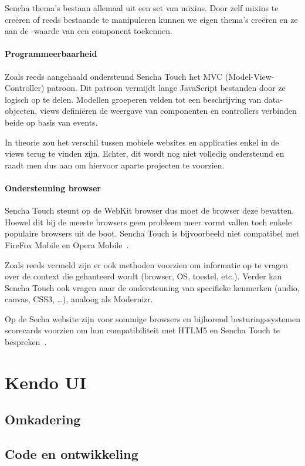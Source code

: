 Sencha thema's bestaan allemaal uit een set van mixins.  Door zelf mixins te creëren of reeds bestaande te manipuleren kunnen we eigen thema's creëren en ze aan de -waarde van een component toekennen.

\paragraph{Programmeerbaarheid}
\label{sec:sencha-programeerbaarheid}
Zoals reeds aangehaald ondersteund Sencha Touch het MVC (Model-View-Controller) patroon.  Dit patroon vermijdt lange JavaScript bestanden door ze logisch op te delen.  Modellen groeperen velden tot een beschrijving van data-objecten,  views definiëren de weergave van componenten en controllers verbinden beide op basis van events.

In theorie zou het verschil tussen mobiele websites en applicaties enkel in de views terug te vinden zijn.  Echter,  dit wordt nog niet volledig ondersteund en raadt men dus aan om hiervoor aparte projecten te voorzien.

\paragraph{Ondersteuning browser}
Sencha Touch steunt op de WebKit browser  dus moet de browser deze bevatten.  Hoewel dit bij de meeste browsers geen probleem meer vormt vallen toch enkele populaire browsers uit de boot.  Sencha Touch is bijvoorbeeld niet compatibel met FireFox Mobile en Opera Mobile~\cite{JohnEClark2012}.

Zoals reeds vermeld zijn er ook methoden voorzien om informatie op te vragen over de context die gehanteerd wordt (browser, OS, toestel, etc.).  Verder kan Sencha Touch ook vragen naar de ondersteuning van specifieke kenmerken (audio,  canvas,  CSS3, …),  analoog als Modernizr.  

Op de Secha website zijn voor sommige browsers en bijhorend besturingssystemen scorecards voorzien om hun compatibiliteit met HTLM5 en Sencha Touch te bespreken~\cite{Inc.}.


\section{Kendo UI}

\subsection{Omkadering}
\subsection{Code en ontwikkeling}
